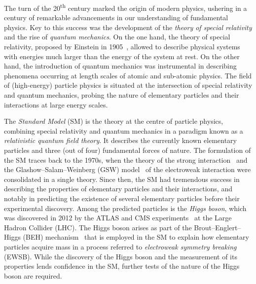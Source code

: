 The turn of the 20\textsuperscript{th} century marked the origin of modern
physics, ushering in a century of remarkable advancements in our understanding
of fundamental physics. Key to this success was the development of the
\emph{theory of special relativity} and the rise of \emph{quantum mechanics}. On
the one hand, the theory of special relativity, proposed by Einstein in
1905~\cite{einstein:1905zedbk,einstein:1905idtekvsea}, allowed to describe
physical systems with energies much larger than the energy of the system at
rest. On the other hand, the introduction of quantum mechanics was instrumental
in describing phenomena occurring at length scales of atomic and sub-atomic
physics. The field of (high-energy) particle physics is situated at the
intersection of special relativity and quantum mechanics, probing the nature of
elementary particles and their interactions at large energy scales.

The \emph{Standard Model} (SM) is the theory at the centre of particle physics,
combining special relativity and quantum mechanics in a paradigm known as a
\emph{relativistic quantum field theory}. It describes the currently known
elementary particles and three (out of four) fundamental forces of nature. The
formulation of the SM traces back to the 1970s, when the theory of the strong
interaction~\cite{Fritzsch:1973pi,Gross:1973id,Politzer:1973fx}
and the Glashow--Salam--Weinberg (GSW)
model~\cite{Glashow:1961tr,Salam:1964ry,Weinberg:1967tq} of the electroweak
interaction were consolidated in a single theory. Since then, the SM had
tremendous success in describing the properties of elementary particles and
their interactions, and notably in predicting the existence of several
elementary particles before their experimental discovery. Among the predicted
particles is the \emph{Higgs boson}, which was discovered in 2012 by the ATLAS
and CMS experiments~\cite{HIGG-2012-27,CMS-HIG-12-028} at the Large Hadron
Collider (LHC). The Higgs boson arises as part of the Brout--Englert--Higgs
(BEH) mechanism~\cite{Englert:1964et,Higgs:1964pj} that is employed in the SM to explain how elementary
particles acquire mass in a process referred to \emph{electroweak symmetry
  breaking} (EWSB).
While the discovery of the Higgs boson and the measurement of its properties
lends confidence in the SM, further tests of the nature of the Higgs boson are
required.

